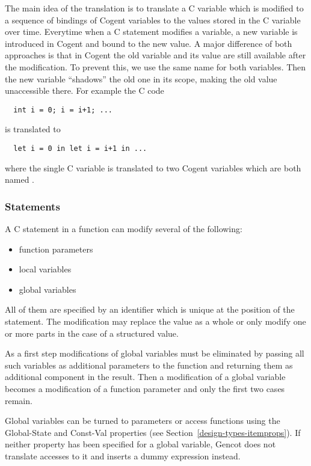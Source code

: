The main idea of the translation is to translate a C variable which is modified to a sequence of bindings of Cogent
variables to the values stored in the C variable over time. Everytime when a C statement modifies a variable, a new
variable is introduced in Cogent and bound to the new value. A major difference of both approaches is that in Cogent 
the old variable and its value are still available after the modification. To prevent this, we use the same name for
both variables. Then the new variable ``shadows'' the old one in its scope, making the old value unaccessible there.
For example the C code
\begin{verbatim}
  int i = 0; i = i+1; ...
\end{verbatim}
is translated to
\begin{verbatim}
  let i = 0 in let i = i+1 in ...
\end{verbatim}
where the single C variable  is translated to two Cogent variables which are both named .

\subsubsection{Statements}

A C statement in a function can modify several of the following:
\begin{itemize}
\item function parameters
\item local variables
\item global variables
\end{itemize}
All of them are specified by an identifier which is unique at the position of the statement. The modification
may replace the value as a whole or only modify one or more parts in the case of a structured value.

As a first step modifications of global variables must be eliminated by passing all such variables as additional 
parameters to the function and returning them as additional component in the result. Then a modification of a
global variable becomes a modification of a function parameter and only the first two cases remain.

Global variables can be turned to parameters or access functions using the Global-State and Const-Val properties
(see Section~\ref{design-types-itemprops}). If neither property has been specified for a global variable, Gencot
does not translate accesses to it and inserts a dummy expression instead.

